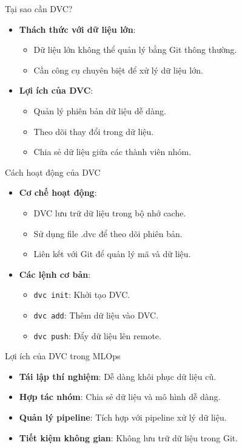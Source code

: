 \documentclass{beamer}
\begin{document}
\begin{frame}{Tại sao cần DVC?}
    \begin{itemize}
        \item \textbf{Thách thức với dữ liệu lớn}:
        \begin{itemize}
            \item Dữ liệu lớn không thể quản lý bằng Git thông thường.
            \item Cần công cụ chuyên biệt để xử lý dữ liệu lớn.
        \end{itemize}
        \item \textbf{Lợi ích của DVC}:
        \begin{itemize}
            \item Quản lý phiên bản dữ liệu dễ dàng.
            \item Theo dõi thay đổi trong dữ liệu.
            \item Chia sẻ dữ liệu giữa các thành viên nhóm.
        \end{itemize}
    \end{itemize}
\end{frame}

\begin{frame}{Cách hoạt động của DVC}
    \begin{itemize}
        \item \textbf{Cơ chế hoạt động}:
        \begin{itemize}
            \item DVC lưu trữ dữ liệu trong bộ nhớ cache.
            \item Sử dụng file .dvc để theo dõi phiên bản.
            \item Liên kết với Git để quản lý mã và dữ liệu.
        \end{itemize}
        \item \textbf{Các lệnh cơ bản}:
        \begin{itemize}
            \item \texttt{dvc init}: Khởi tạo DVC.
            \item \texttt{dvc add}: Thêm dữ liệu vào DVC.
            \item \texttt{dvc push}: Đẩy dữ liệu lên remote.
        \end{itemize}
    \end{itemize}
\end{frame}

\begin{frame}{Lợi ích của DVC trong MLOps}
    \begin{itemize}
        \item \textbf{Tái lập thí nghiệm}: Dễ dàng khôi phục dữ liệu cũ.
        \item \textbf{Hợp tác nhóm}: Chia sẻ dữ liệu và mô hình dễ dàng.
        \item \textbf{Quản lý pipeline}: Tích hợp với pipeline xử lý dữ liệu.
        \item \textbf{Tiết kiệm không gian}: Không lưu trữ dữ liệu trong Git.
    \end{itemize}
\end{frame}
\end{document}
